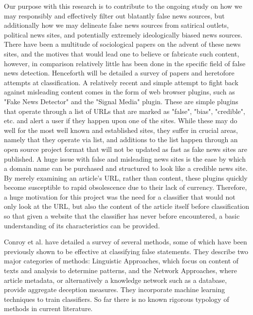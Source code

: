 \documentclass{article}
\begin{document}
Our purpose with this research is to contribute to the ongoing study on how we may responsibly and effectively filter out blatantly false news sources, but additionally how we may delineate false news sources from satirical outlets, political news sites, and potentially extremely ideologically biased news sources. There have been a multitude of sociological papers on the advent of these news sites, and the motives that would lead one to believe or fabricate such content, however, in comparison relatively little has been done in the specific field of false news detection. Henceforth will be detailed a survey of papers and heretofore attempts at classification. A relatively recent and simple attempt to fight back against misleading content comes in the form of web browser plugins, such as "Fake News Detector" and the "Signal Media" plugin. These are simple plugins that operate through a list of URLs that are marked as "false", "bias", "credible", etc. and alert a user if they happen upon one of the sites. While these may do well for the most well known and established sites, they suffer in crucial areas, namely that they operate via list, and additions to the list happen through an open source project format that will not be updated as fast as fake news sites are published. A huge issue with false and misleading news sites is the ease by which a domain name can be purchased and structured to look like a credible news site. By merely examining an article's URL, rather than content, these plugins quickly become susceptible to rapid obsolescence due to their lack of currency. Therefore, a huge motivation for this project was the need for a classifier that would not only look at the URL, but also the content of the article itself before classification so that given a website that the classifier has never before encountered, a basic understanding of its characteristics can be provided. \par
Conroy et al. have detailed a survey of several methods, some of which have been previously shown to be effective at classifying false statements. They describe two major categories of methods: Linguistic Approaches, which focus on content of texts and analysis to determine patterns, and the Network Approaches, where article metadata, or alternatively a knowledge network such as a database, provide aggregate deception measures. They incorporate machine learning techniques to train classifiers. So far there is no known rigorous typology of methods in current literature. \par
\end{document}
